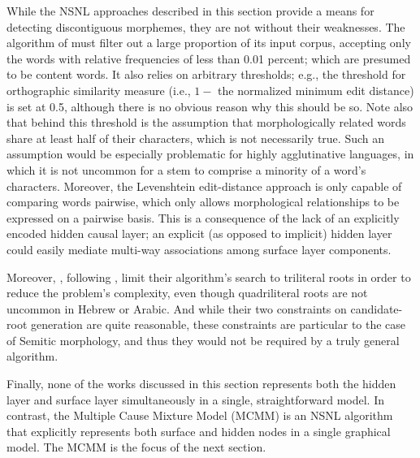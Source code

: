 While the NSNL approaches described in this section provide a means for detecting discontiguous morphemes, they are not without their weaknesses. 
The algorithm of \cite{baroni-et-al:2002} must filter out a large proportion of its input corpus, accepting only the words with relative frequencies of less than 0.01 percent; which are presumed to be content words.
It also relies on arbitrary thresholds; e.g., the threshold for orthographic similarity measure (i.e., $1 - $ the normalized minimum edit distance) is set at 0.5, although there is no obvious reason why this should be so.
Note also that behind this threshold is the assumption that morphologically related words share at least half of their characters, which is not necessarily true. Such an assumption would be especially problematic for highly agglutinative languages, 
in which it is not uncommon for a stem to comprise a minority of a word's characters.
Moreover, the Levenshtein edit-distance approach is only capable of comparing words pairwise, which only allows morphological relationships to be expressed on a pairwise basis. This is a consequence of the lack of an explicitly encoded hidden causal layer; an explicit (as opposed to implicit) hidden layer could easily mediate multi-way associations among surface layer components.                                   

Moreover, \cite{rodrigues-and-cavar:2005}, following \cite{elghamry:2005}, limit their algorithm's search to triliteral roots in order to reduce the problem's complexity, even though quadriliteral roots are not uncommon in Hebrew or Arabic.
And while their two constraints on candidate-root generation are quite reasonable, these constraints are particular to the case of Semitic morphology, and thus they would not be required by a truly general algorithm.

Finally, none of the works discussed in this section represents both the hidden layer and surface layer simultaneously in a single, straightforward model. In contrast, the Multiple Cause Mixture Model (MCMM) \citep{saund:94} is an NSNL algorithm that explicitly represents both surface and hidden nodes in a single graphical model. The MCMM is the focus of the next section.

